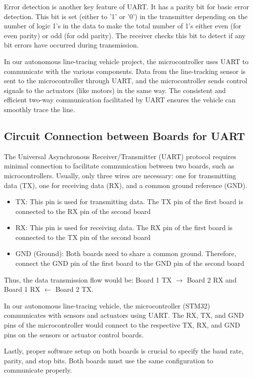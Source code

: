 \documentclass[12pt, a4paper, oneside]{report}
\begin{document}
Error detection is another key feature of UART. It has a parity bit for basic error detection. This bit is set (either to '1' or '0') in the transmitter depending on the number of logic 1's in the data to make the total number of 1's either even (for even parity) or odd (for odd parity). The receiver checks this bit to detect if any bit errors have occurred during transmission.

In our autonomous line-tracing vehicle project, the microcontroller uses UART to communicate with the various components. Data from the line-tracking sensor is sent to the microcontroller through UART, and the microcontroller sends control signals to the actuators (like motors) in the same way. The consistent and efficient two-way communication facilitated by UART ensures the vehicle can smoothly trace the line.

\subsection{Circuit Connection between Boards for UART}
The Universal Asynchronous Receiver/Transmitter (UART) protocol requires minimal connection to facilitate communication between two boards, such as microcontrollers. Usually, only three wires are necessary: one for transmitting data (TX), one for receiving data (RX), and a common ground reference (GND).
\begin{itemize}
    \item TX: This pin is used for transmitting data. The TX pin of the first board is connected to the RX pin of the second board
    \item RX: This pin is used for receiving data. The RX pin of the first board is connected to the TX pin of the second board
    \item GND (Ground): Both boards need to share a common ground. Therefore, connect the GND pin of the first board to the GND pin of the second board
\end{itemize}

Thus, the data transmission flow would be: Board 1 TX $\rightarrow$ Board 2 RX and Board 1 RX $\leftarrow$ Board 2 TX.

In our autonomous line-tracing vehicle, the microcontroller (STM32) communicates with sensors and actuators using UART. The RX, TX, and GND pins of the microcontroller would connect to the respective TX, RX, and GND pins on the sensors or actuator control boards.

Lastly, proper software setup on both boards is crucial to specify the baud rate, parity, and stop bits. Both boards must use the same configuration to communicate properly.
\end{document}
